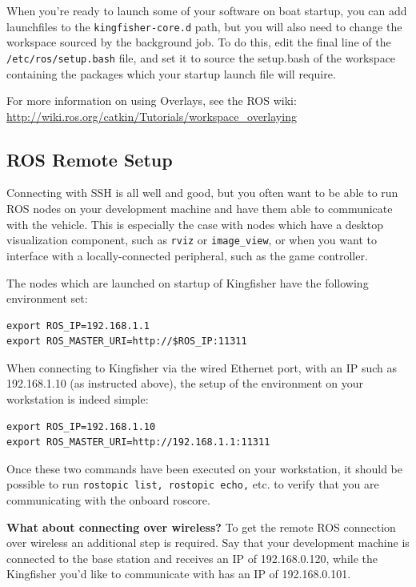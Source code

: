\documentclass[]{clearpath-latex/clearpath-manual}
\begin{document}
When you’re ready to launch some of your software on boat startup, you can add launchfiles to the \lstinline{kingfisher-core.d} path, but you will also need to change the workspace sourced by the background job. To do this, edit the final line of the \lstinline{/etc/ros/setup.bash} file, and set it to source the setup.bash of the workspace containing the packages which your startup launch file will require.

For more information on using Overlays, see the ROS wiki: \url{http://wiki.ros.org/catkin/Tutorials/workspace_overlaying}

\subsection{ROS Remote Setup}
Connecting with SSH is all well and good, but you often want to be able to run ROS nodes on your development machine and have them able to communicate with the vehicle. This is especially the case with nodes which have a desktop visualization component, such as \lstinline{rviz} or \lstinline{image_view}, or when you want to interface with a locally-connected peripheral, such as the game controller.

The nodes which are launched on startup of Kingfisher have the following environment set:

\begin{lstlisting}
export ROS_IP=192.168.1.1 
export ROS_MASTER_URI=http://$ROS_IP:11311
\end{lstlisting}

When connecting to Kingfisher via the wired Ethernet port, with an IP such as 192.168.1.10 (as instructed above), the setup of the environment on your workstation is indeed simple:

\begin{lstlisting}
export ROS_IP=192.168.1.10 
export ROS_MASTER_URI=http://192.168.1.1:11311
\end{lstlisting}

Once these two commands have been executed on your workstation, it should be possible to run \lstinline{rostopic list, rostopic echo,} etc. to verify that you are communicating with the onboard roscore.

\textbf{What about connecting over wireless?} To get the remote ROS connection over wireless an additional step is required. Say that your development machine is connected to the base station and receives an IP of 192.168.0.120, while the Kingfisher you’d like to communicate with has an IP of 192.168.0.101.
\end{document}
